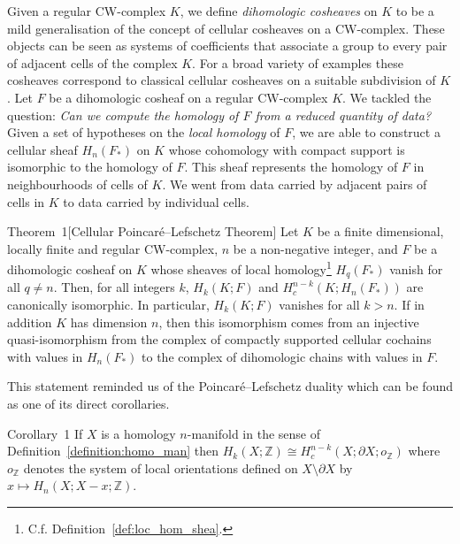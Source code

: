 \documentclass[AHL,Unicode,longabstracts,published]{cedram}
\newcommand{\Z}{\mathbb{Z}}
\begin{document}
Given a regular CW-complex $K$, we define \emph{dihomologic cosheaves} on $K$ to be a mild generalisation of the concept of cellular cosheaves on a CW-complex. These objects can be seen as systems of coefficients that associate a group to every pair of adjacent cells of the complex $K$. For a broad variety of examples these cosheaves correspond to classical cellular cosheaves on a suitable subdivision of $K$. Let $F$ be a dihomologic cosheaf on a regular CW-complex $K$. We tackled the question: \emph{Can we compute the homology of $F$ from a reduced quantity of data?} Given a set of hypotheses on the \emph{local homology} of $F$, we are able to construct a cellular sheaf $H_n(F_*)$ on $K$ whose cohomology with compact support is isomorphic to the homology of $F$. This sheaf represents the homology of $F$ in neighbourhoods of cells of $K$. We went from data carried by adjacent pairs of cells in $K$ to data carried by individual cells.

\begin{enonce*}{Theorem~1}[Cellular Poincaré--Lefschetz Theorem]
Let $K$ be a finite dimensional, locally finite and regular CW-complex, $n$ be a non-negative integer, and $F$ be a dihomologic cosheaf on $K$ whose sheaves of local homology\footnote{C.f. Definition~\ref{def:loc_hom_shea}.} $H_q(F_*)$ vanish for all $q\neq n$. Then, for all integers $k$, $H_k(K;F)$ and $H_c^{n-k}(K;H_n(F_*))$ are canonically isomorphic. In particular, $H_k(K;F)$ vanishes for all $k>n$. If in addition $K$ has dimension $n$, then this isomorphism comes from an injective quasi-isomorphism from the complex of compactly supported cellular cochains with values in $H_n(F_*)$ to the complex of dihomologic chains with values in $F$.
\end{enonce*}

This statement reminded us of the Poincaré--Lefschetz duality which can be found as one of its direct corollaries.

\begin{enonce*}{Corollary~1}
If $X$ is a homology $n$-manifold in the sense of Definition~\ref{definition:homo_man} then $H_k(X;\Z)\cong H^{n-k}_c(X;\partial X; o_\Z)$ where $o_\Z$ denotes the system of local orientations defined on $X\setminus\partial X$ by $x\mapsto H_n(X;X-x;\Z)$.
\end{enonce*}
\end{document}
